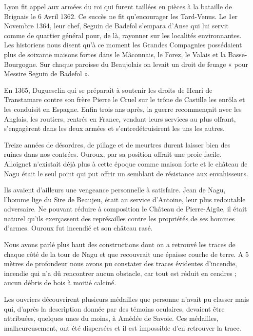 Lyon fit appel aux armées du roi qui furent taillées en pièces à la bataille de Brignais le 6 Avril 1362. Ce succès ne fit qu'encourager les Tard-Venus. Le 1er Novembre 1364, leur chef, Seguin de Badefol s'empara d'Anse qui lui servit comme de quartier général pour, de là, rayonner sur les localités environnantes. Les historiens nous disent qu'à ce moment les Grandes Compagnies possédaient plus de soixante maisons fortes dans le Mâconnais, le Forez, le Valais et la Basse-Bourgogne. Sur chaque paroisse du Beaujolais on levait un droit de feuage « pour Messire Seguin de Badefol ».

En 1365, Duguesclin qui se préparait à soutenir les droits de Henri de Transtamare contre son frère Pierre le Cruel sur le trône de Castille les enrôla et les conduisit en Espagne. Enfin trois ans après, la guerre recommençait avec les Anglais, les routiers, rentrés en France, vendant leurs services au plus offrant, s'engagèrent dans les deux armées et s'entredétruisirent les uns les autres.

Treize années de désordres, de pillage et de meurtres durent laisser bien des ruines dans nos contrées. Ouroux, par sa position
offrait une proie facile. Alloignet n'existait déjà plus à cette époque comme maison forte et le château de Nagu était le seul point qui put offrir un semblant de résistance aux envahisseurs.

Ils avaient d'ailleurs une vengeance personnelle à satisfaire. Jean de Nagu, l'homme lige du Sire de Beaujeu, était au service d'Antoine, leur plus redoutable adversaire. Ne pouvant réduire à composition le Château de Pierre-Aigüe, il était naturel qu'ils exerçassent des représailles contre les propriétés de ses hommes d'armes. Ouroux fut incendié et son château rasé.

Nous avons parlé plus haut des constructions dont on a retrouvé les traces de chaque côté de la tour de Nagu et que recouvrait une épaisse couche de terre. A 5 mètres de profondeur nous avons pu constater des traces évidentes d'incendie, incendie qui n'a dû rencontrer aucun obstacle, car tout est réduit en cendres ; aucun débris de bois à moitié calciné.

Les ouvriers découvrirent plusieurs médailles que personne n'avait pu classer mais qui, d'après la description donnée par des témoins oculaires, devaient être attribuées, quelques unes du moins, à Amédée de Savoie. Ces médailles, malheureusement, ont été dispersées et il est impossible d'en retrouver la trace.

